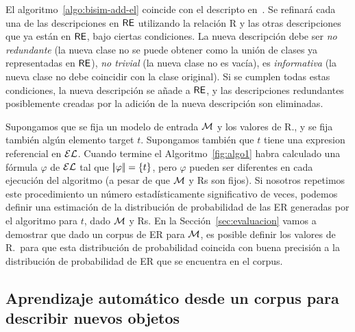 El algoritmo~\ref{algo:bisim-add-el} coincide con el descripto
en~\cite{arec2:2008:Areces}. Se refinar\'a cada una de las descripciones
en $\textsf{RE}$ utilizando la relaci\'on R y las otras descripciones que ya est\'an en
$\textsf{RE}$, bajo ciertas condiciones. La nueva descripci\'on debe ser
\emph{no redundante} (la nueva clase no se puede obtener como la uni\'on de
clases ya representadas en $\textsf{RE}$), \emph{no trivial} (la nueva
clase no es vac\'{i}a), es \emph{informativa} (la nueva clase no debe
coincidir con la clase original). Si se cumplen todas estas condiciones,
la nueva descripci\'on se a\~nade a $\textsf{RE}$, y las descripciones redundantes
posiblemente creadas por la adici\'on de la nueva descripci\'on son
eliminadas.

Supongamos que se fija un modelo de entrada $\mathcal{M}$ y los valores de R.\puse, y se fija tambi\'en
alg\'un elemento target $t$. Supongamos tambi\'en que $t$ tiene una expresion referencial en 
$\mathcal{EL}$. Cuando termine el
Algoritmo~\ref{fig:algo1} habra calculado una f\'ormula $\varphi$ de $\mathcal{EL}$ tal
que $|\!|\varphi|\!| = \{t\}$, pero $\varphi$ pueden ser diferentes en
cada ejecuci\'on del algoritmo (a pesar de que $\mathcal{M}$ y Rs son fijos). Si nosotros
repetimos este procedimiento un n\'umero estad\'{i}sticamente significativo de veces,
podemos definir una estimaci\'on de la distribuci\'on de probabilidad de las ER
generadas por el algoritmo para $t$, dado $\mathcal{M}$ y Rs. En la
Secci\'on~\ref{sec:evaluacion} vamos a demostrar que dado un corpus de ER
para $\mathcal{M}$, es posible definir los valores de R.\puse\ para que esta
distribuci\'on de probabilidad coincida con buena precisi\'on a la distribuci\'on de probabilidad
 de ER que se encuentra en el corpus.






\subsection{Aprendizaje autom\'atico desde un corpus para describir nuevos objetos}
\label{sec:learning}




